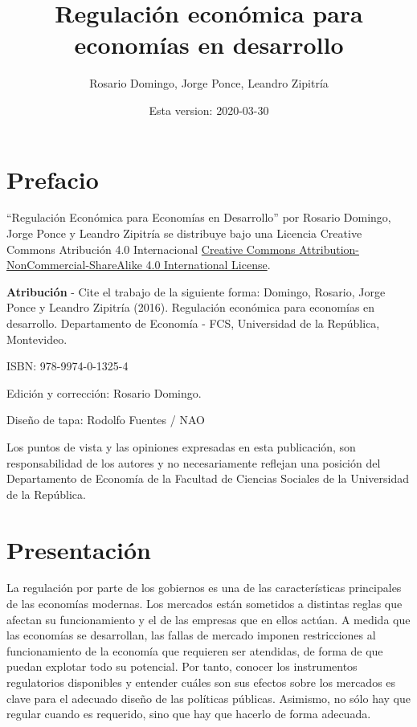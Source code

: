 \documentclass[
  12pt,
  spanish,
]{book}
\title{Regulación económica para economías en desarrollo}
\author{Rosario Domingo, Jorge Ponce, Leandro Zipitría}
\date{Esta version: 2020-03-30}
\begin{document}
\maketitle

{
\setcounter{tocdepth}{1}
\tableofcontents
}
\hypertarget{prefacio}{%
\chapter*{Prefacio}\label{prefacio}}

``Regulación Económica para Economías en Desarrollo'' por Rosario Domingo, Jorge Ponce y Leandro Zipitría se distribuye bajo una Licencia Creative Commons Atribución 4.0 Internacional \href{http://creativecommons.org/licenses/by-nc-sa/4.0/}{Creative Commons Attribution-NonCommercial-ShareAlike 4.0 International License}.

\textbf{Atribución} - Cite el trabajo de la siguiente forma: Domingo, Rosario, Jorge Ponce y Leandro Zipitría (2016). Regulación económica para economías en desarrollo. Departamento de Economía - FCS, Universidad de la República, Montevideo.

ISBN: 978-9974-0-1325-4

Edición y corrección: Rosario Domingo.

Diseño de tapa: Rodolfo Fuentes / NAO

Los puntos de vista y las opiniones expresadas en esta publicación, son responsabilidad de los autores y no necesariamente reflejan una posición del Departamento de Economía de la Facultad de Ciencias Sociales de la Universidad de la República.

\newpage

\hypertarget{intro}{%
\chapter*{Presentación}\label{intro}}

La regulación por parte de los gobiernos es una de las características principales de las economías modernas. Los mercados están sometidos a distintas reglas que afectan su funcionamiento y el de las empresas que en ellos actúan. A medida que las economías se desarrollan, las fallas de mercado imponen restricciones al funcionamiento de la economía que requieren ser atendidas, de forma de que puedan explotar todo su potencial. Por tanto, conocer los instrumentos regulatorios disponibles y entender cuáles son sus efectos sobre los mercados es clave para el adecuado diseño de las políticas públicas. Asimismo, no sólo hay que regular cuando es requerido, sino que hay que hacerlo de forma adecuada.
\end{document}
